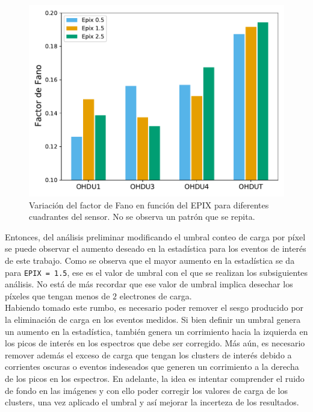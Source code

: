 \begin{figure}[h]
    \centering
    \includegraphics[scale=0.5]{Figs/Fano_vs_Epix.pdf}
    \caption{\footnotesize{Variación del factor de Fano en función del EPIX para diferentes cuadrantes del sensor. No se observa un patrón que se repita.}}
    \label{fig:FanoVsEpix}
\end{figure}
Entonces, del análisis preliminar modificando el umbral conteo de carga por píxel se puede observar el aumento deseado en la estadística para los eventos de interés de este trabajo. Como se observa que el mayor aumento en la estadística se da para \verb|EPIX = 1.5|, ese es el valor de umbral con el que se realizan los subsiguientes análisis. No está de más recordar que ese valor de umbral implica desechar los píxeles que tengan menos de $2$ electrones de carga.\\
\indent Habiendo tomado este rumbo, es necesario poder remover el sesgo producido por la eliminación de carga en los eventos medidos. Si bien definir un umbral genera un aumento en la estadística, también genera un corrimiento hacia la izquierda en los picos de interés en los espectros que debe ser corregido. Más aún, es necesario remover además el exceso de carga que tengan los clusters de interés debido a corrientes oscuras o eventos indeseados que generen un corrimiento a la derecha de los picos en los espectros. En adelante, la idea es intentar comprender el ruido de fondo en las imágenes y con ello poder corregir los valores de carga de los clusters, una vez aplicado el umbral y así mejorar la incerteza de los resultados.

